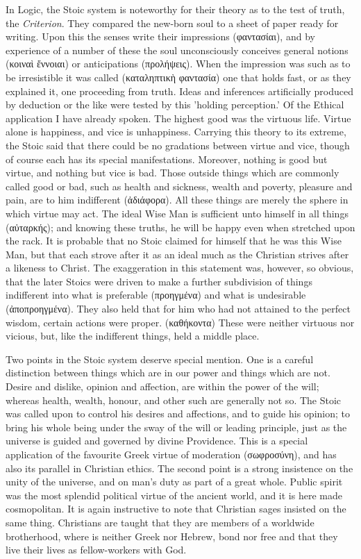 In Logic, the Stoic system is noteworthy for their theory as to the test of
truth, the \emph{Criterion}. They compared the new-born soul to a sheet of
paper ready for writing. Upon this the senses write their impressions
(φαντασίαι), and by experience of
a number of these the soul unconsciously conceives general notions
(κοιναὶ
ἔννοιαι) or anticipations
(προλήψεις). When the impression
was such as to be irresistible it was called
(καταληπτικὴ
φαντασία) one that holds fast, or as
they explained it, one proceeding from truth. Ideas and inferences artificially
produced by deduction or the like were tested by this 'holding perception.' Of
the Ethical application I have already spoken. The highest good was the
virtuous life. Virtue alone is happiness, and vice is unhappiness. Carrying
this theory to its extreme, the Stoic said that there could be no gradations
between virtue and vice, though of course each has its special manifestations.
Moreover, nothing is good but virtue, and nothing but vice is bad. Those
outside things which are commonly called good or bad, such as health and
sickness, wealth and poverty, pleasure and pain, are to him indifferent
(ἀδιάφορα). All these things are
merely the sphere in which virtue may act. The ideal Wise Man is sufficient
unto himself in all things
(αὐταρκής); and knowing these truths,
he will be happy even when stretched upon the rack. It is probable that no
Stoic claimed for himself that he was this Wise Man, but that each strove after
it as an ideal much as the Christian strives after a likeness to Christ. The
exaggeration in this statement was, however, so obvious, that the later Stoics
were driven to make a further subdivision of things indifferent into what is
preferable (προηγμένα) and what
is undesirable
(ἀποπροηγμένα).
They also held that for him who had not attained to the perfect wisdom, certain
actions were proper. (καθήκοντα)
These were neither virtuous nor vicious, but, like the indifferent things, held
a middle place.

Two points in the Stoic system deserve special mention. One is a careful
distinction between things which are in our power and things which are not.
Desire and dislike, opinion and affection, are within the power of the will;
whereas health, wealth, honour, and other such are generally not so. The Stoic
was called upon to control his desires and affections, and to guide his
opinion; to bring his whole being under the sway of the will or leading
principle, just as the universe is guided and governed by divine Providence.
This is a special application of the favourite Greek virtue of moderation
(σωφροσύνη), and has also its
parallel in Christian ethics. The second point is a strong insistence on the
unity of the universe, and on man's duty as part of a great whole. Public
spirit was the most splendid political virtue of the ancient world, and it is
here made cosmopolitan. It is again instructive to note that Christian sages
insisted on the same thing. Christians are taught that they are members of a
worldwide brotherhood, where is neither Greek nor Hebrew, bond nor free and
that they live their lives as fellow-workers with God.

